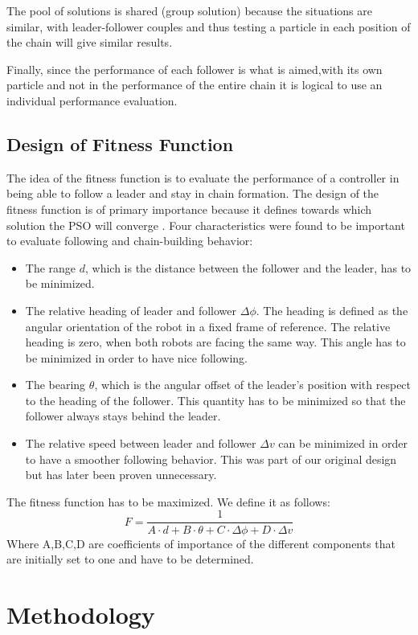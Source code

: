 \documentclass[a4paper, 10pt, conference]{ieeeconf}      %
\begin{document}
The pool of solutions is shared (group solution) because the situations are similar, with leader-follower couples and thus testing a particle in each position of the chain will give similar results.

Finally, since the performance of each follower is what is aimed,with its own particle and not in the performance of the entire chain it is logical to use an individual performance evaluation.

\subsection{Design of Fitness Function}
The idea of the fitness function is to evaluate the performance of a controller in being able to follow a leader and stay in chain formation. The design of the fitness function is of primary importance because it defines towards which solution the PSO will converge \cite{c2}. Four characteristics were found to be important to evaluate following and chain-building behavior:
\begin{itemize}
\item The range $d$, which is the distance between the follower and the leader, has to be minimized.
\item The relative heading of leader and follower $\Delta \phi $. The heading is defined as the angular orientation of the robot in a fixed frame of reference. The relative heading is zero, when both robots are facing the same way. This angle has to be minimized in order to have nice following. 
\item The bearing $\theta $, which is the angular offset of the leader's position with respect to the heading of the follower. This quantity has to be minimized so that the follower always stays behind the leader.
\item The relative speed between leader and follower $\Delta v $ can be minimized in order to have a smoother following behavior. This was part of our original design but has later been proven unnecessary.
\end{itemize}
The fitness function has to be maximized. We define it as follows:
\begin{equation}\label{fitness}
F=\frac{1}{A \cdot d+B \cdot \theta+C \cdot \Delta \phi+D \cdot \Delta v}
\end{equation}
Where A,B,C,D are coefficients of importance of the different components that are initially set to one and have to be determined.

\section{Methodology}
\end{document}
